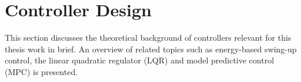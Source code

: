 \section{Controller Design}
\label{Chapter:Cont}
This section discusses the theoretical background of controllers relevant for this thesis work in brief. An overview of related topics such as energy-based swing-up control, the linear quadratic regulator (LQR) and model predictive control (MPC) is presented.
% 
% 



